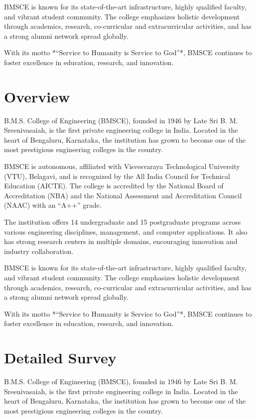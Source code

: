 \documentclass[12pt,a4paper]{report}
\begin{document}
BMSCE is known for its state-of-the-art infrastructure, highly qualified faculty, and vibrant 
student community. The college emphasizes holistic development through academics, research, 
co-curricular and extracurricular activities, and has a strong alumni network spread 
globally. 

With its motto *“Service to Humanity is Service to God”*, BMSCE continues to foster 
excellence in education, research, and innovation.
\section{ Overview}
    B.M.S. College of Engineering (BMSCE), founded in 1946 by Late Sri B. M. Sreenivasaiah, 
is the first private engineering college in India. Located in the heart of Bengaluru, 
Karnataka, the institution has grown to become one of the most prestigious engineering 
colleges in the country. 

BMSCE is autonomous, affiliated with Visvesvaraya Technological University (VTU), Belagavi, 
and is recognized by the All India Council for Technical Education (AICTE). The college is 
accredited by the National Board of Accreditation (NBA) and the National Assessment and 
Accreditation Council (NAAC) with an “A++” grade.

The institution offers 14 undergraduate and 15 postgraduate programs across various 
engineering disciplines, management, and computer applications. It also has strong research 
centers in multiple domains, encouraging innovation and industry collaboration. 

BMSCE is known for its state-of-the-art infrastructure, highly qualified faculty, and vibrant 
student community. The college emphasizes holistic development through academics, research, 
co-curricular and extracurricular activities, and has a strong alumni network spread 
globally. 

With its motto *“Service to Humanity is Service to God”*, BMSCE continues to foster 
excellence in education, research, and innovation.
\section{ Detailed Survey }
B.M.S. College of Engineering (BMSCE), founded in 1946 by Late Sri B. M. Sreenivasaiah, 
is the first private engineering college in India. Located in the heart of Bengaluru, 
Karnataka, the institution has grown to become one of the most prestigious engineering 
colleges in the country. 
\end{document}

